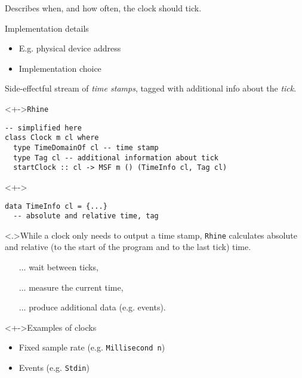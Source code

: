 \documentclass[handout]{enigtex-beamer-base}
\begin{document}
\begin{frame}[fragile]
	\begin{description}[<+->]
		\item[Clock type] Describes when, and how often,
		the clock should tick.
		\item[Clock value] Implementation details
		\begin{itemize}[<+->]
			\item E.g. physical device address
			\item Implementation choice
		\end{itemize}
		\item[Running clock] Side-effectful stream of \emph{time stamps}, tagged with additional info about the \emph{tick}.
	\end{description}
\end{frame}


\begin{frame}[fragile]
\begin{block}<+->{\texttt{Rhine}}
\begin{verbatim}
-- simplified here
class Clock m cl where
  type TimeDomainOf cl -- time stamp
  type Tag cl -- additional information about tick
  startClock :: cl -> MSF m () (TimeInfo cl, Tag cl)
\end{verbatim}
\end{block}

\begin{block}<+->{}
\begin{verbatim}
data TimeInfo cl = {...}
  -- absolute and relative time, tag
\end{verbatim}
\end{block}
\note<.>{While a clock only needs to output a time stamp,
\texttt{Rhine} calculates absolute and relative (to the start of the program and to the last tick) time.}
\end{frame}


\begin{frame}[fragile]
\begin{itemize}
	\item[...] wait between ticks,
	\item[...] measure the current time,
	\item[...] produce additional data (e.g. events).
\end{itemize}

\begin{block}<+->{Examples of clocks}
\begin{itemize}
	\item Fixed sample rate (e.g. \texttt{Millisecond n})
	\item Events (e.g. \texttt{Stdin})
\end{itemize}
\end{block}
\end{frame}
\end{document}
